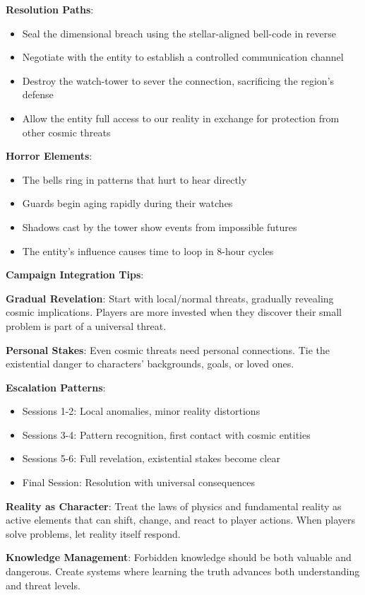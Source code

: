 \documentclass[11pt]{article}
\begin{document}
\begin{mdframed}[backgroundcolor=shadecolor]
\textbf{Resolution Paths}:
\begin{itemize}[leftmargin=*]
\item Seal the dimensional breach using the stellar-aligned bell-code in reverse
\item Negotiate with the entity to establish a controlled communication channel
\item Destroy the watch-tower to sever the connection, sacrificing the region's defense
\item Allow the entity full access to our reality in exchange for protection from other cosmic threats
\end{itemize}

\textbf{Horror Elements}:
\begin{itemize}[leftmargin=*]
\item The bells ring in patterns that hurt to hear directly
\item Guards begin aging rapidly during their watches
\item Shadows cast by the tower show events from impossible futures
\item The entity's influence causes time to loop in 8-hour cycles
\end{itemize}
\end{mdframed}

\begin{mdframed}[backgroundcolor=horrorbg]
\textbf{Campaign Integration Tips}:

\textbf{Gradual Revelation}:
Start with local/normal threats, gradually revealing cosmic implications. Players are more invested when they discover their small problem is part of a universal threat.

\textbf{Personal Stakes}:
Even cosmic threats need personal connections. Tie the existential danger to characters' backgrounds, goals, or loved ones.

\textbf{Escalation Patterns}:
\begin{itemize}[leftmargin=*]
\item Sessions 1-2: Local anomalies, minor reality distortions
\item Sessions 3-4: Pattern recognition, first contact with cosmic entities
\item Sessions 5-6: Full revelation, existential stakes become clear
\item Final Session: Resolution with universal consequences
\end{itemize}

\textbf{Reality as Character}:
Treat the laws of physics and fundamental reality as active elements that can shift, change, and react to player actions. When players solve problems, let reality itself respond.

\textbf{Knowledge Management}:
Forbidden knowledge should be both valuable and dangerous. Create systems where learning the truth advances both understanding and threat levels.
\end{mdframed}
\end{document}
